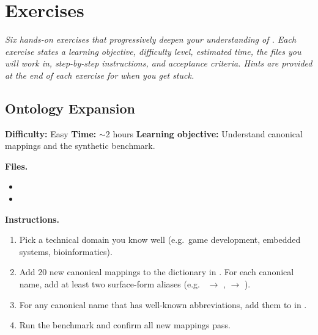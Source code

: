\chapter{Exercises}
\label{ch:exercises}

\textit{Six hands-on exercises that progressively deepen your understanding
of \sysname{}.  Each exercise states a learning objective, difficulty
level, estimated time, the files you will work in, step-by-step
instructions, and acceptance criteria.  Hints are provided at the end of
each exercise for when you get stuck.}

\section{Ontology Expansion}
\label{sec:ex-ontology-expansion}

\noindent\textbf{Difficulty:} Easy \quad
\textbf{Time:} $\sim$2 hours \quad
\textbf{Learning objective:} Understand canonical mappings and the
synthetic benchmark.

\medskip\noindent\textbf{Files.}

\begin{itemize}
    \item {}
    \item {}
\end{itemize}

\medskip\noindent\textbf{Instructions.}

\begin{enumerate}
    \item Pick a technical domain you know well (e.g.\ game development,
          embedded systems, bioinformatics).
    \item Add 20 new canonical mappings to the 
          dictionary in .  For each canonical name,
          add at least two surface-form aliases (e.g.\ 
          $\rightarrow$ ,
           $\rightarrow$ ).
    \item For any canonical name that has well-known abbreviations, add
          them to  in
          .
    \item Run the benchmark and confirm all new mappings pass.
\end{enumerate}

